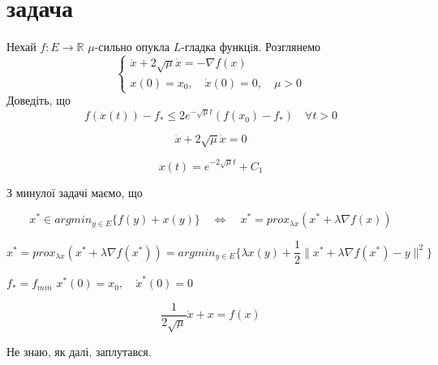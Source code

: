 \section{задача}

\begin{tcolorbox}[title=Умова]
    Нехай $f : E \rightarrow \mathbb{R}$  $\mu$-сильно опукла $L$-гладка функцiя. Розглянемо
    $$
    \begin{cases}
        \ddot{x} + 2 \sqrt{\mu} \dot{x} = - \nabla f(x) \\
        x(0) = x_0, \quad \dot{x}(0) = 0, \quad \mu > 0
    \end{cases}
    $$
    Доведіть, що 
    $$ f(x(t)) - f_* \le 2 e^{-\sqrt{\mu}t}(f(x_0) - f_*) \quad \forall t > 0 $$
\end{tcolorbox}


$$
\ddot{x} + 2 \sqrt{\mu} \dot{x} = 0 
$$

$$x(t) = e^{-2\sqrt{\mu} t} + C_1$$

З минулої задачі маємо, що


$$x^* \in argmin_{y \in E} \{f(y) + x(y)\} \quad
\Leftrightarrow\quad x^* = prox_{\lambda x}(x^* + \lambda \nabla f(x)) $$

$$x^* = prox_{\lambda x}(x^* + \lambda \nabla f(x^*))= argmin_{y \in E}
\{\lambda x(y) + \frac{1}{2} \|x^* + \lambda \nabla f(x^*) - y\|^2 \}$$

$f_* = f_{min}$
$x^*(0) = x_0, \quad \dot{x}^*(0) = 0$

$$\frac{1}{2\sqrt{\mu}}\dot{x} + x = f(x) $$

Не знаю, як далі, заплутався.